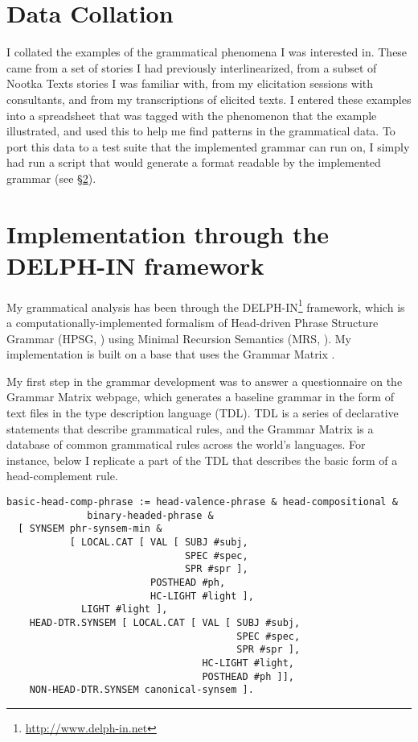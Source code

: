 \section{Data Collation} \label{ch:method:collation}

I collated the examples of the grammatical phenomena I was interested in. These came from a set of stories I had previously interlinearized, from a subset of Nootka Texts stories I was familiar with, from my elicitation sessions with consultants, and from my transcriptions of elicited texts. I entered these examples into a spreadsheet that was tagged with the phenomenon that the example illustrated, and used this to help me find patterns in the grammatical data. To port this data to a test suite that the implemented grammar can run on, I simply had run a script that would generate a format readable by the implemented grammar (see \S\ref{ch:method:delphin}).

\section{Implementation through the DELPH-IN framework} \label{ch:method:delphin}

My grammatical analysis has been through the DELPH-IN\footnote{\url{http://www.delph-in.net}} framework, which is a computationally-implemented formalism of Head-driven Phrase Structure Grammar (HPSG, \citealt{pollardsag1994}) using Minimal Recursion Semantics (MRS, \citealt{copestake2005}). My implementation is built on a base that uses the Grammar Matrix \citep{bender2002, flickinger2003, benderetal2010}.

My first step in the grammar development was to answer a questionnaire on the Grammar Matrix webpage, which generates a baseline grammar in the form of text files in the type description language (TDL). TDL is a series of declarative statements that describe grammatical rules, and the Grammar Matrix is a database of common grammatical rules across the world's languages. For instance, below I replicate a part of the TDL that describes the basic form of a head-complement rule.

\begin{verbatim}
basic-head-comp-phrase := head-valence-phrase & head-compositional &
              binary-headed-phrase &
  [ SYNSEM phr-synsem-min &
           [ LOCAL.CAT [ VAL [ SUBJ #subj,
                               SPEC #spec,
                               SPR #spr ],
                         POSTHEAD #ph,
                         HC-LIGHT #light ],
             LIGHT #light ],
    HEAD-DTR.SYNSEM [ LOCAL.CAT [ VAL [ SUBJ #subj,
                                        SPEC #spec,
                                        SPR #spr ],
                                  HC-LIGHT #light,
                                  POSTHEAD #ph ]],
    NON-HEAD-DTR.SYNSEM canonical-synsem ].
\end{verbatim}

